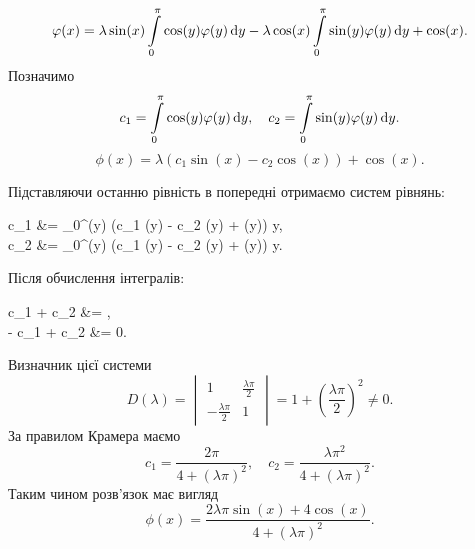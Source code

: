 \begin{solution}
	\[ \varphi(x) = \lambda \sin(x) \displaystyle\int\limits_0^\pi \cos(y) \varphi(y) \mathop{}\!\mathrm{d} y - \lambda \cos(x) \displaystyle\int\limits_0^\pi \sin(y) \varphi(y) \mathop{}\!\mathrm{d} y + \cos(x). \]
	Позначимо \[ c_1 = \displaystyle\int\limits_0^\pi \cos(y) \varphi(y) \mathop{}\!\mathrm{d} y, \quad c_2 = \displaystyle\int\limits_0^\pi \sin(y) \varphi(y) \mathop{}\!\mathrm{d} y. \]
	\[ \phi(x) = \lambda (c_1 \sin(x) - c_2 \cos(x)) + \cos(x). \]

	Підставляючи останню рівність в попередні отримаємо систем рівнянь:
	\begin{system*}
		c_1 &= \Int_0^\pi \cos(y) (\lambda c_1 \sin(y) - \lambda c_2 \cos(y) + \cos(y)) \diff y, \\
		c_2 &= \Int_0^\pi \sin(y) (\lambda c_1 \sin(y) - \lambda c_2 \cos(y) + \cos(y)) \diff y.
	\end{system*}
	Після обчислення інтегралів:
	\begin{system*}
		c_1 +  c_2 &= \frac{\pi}{2}, \\
		-  c_1 + c_2 &= 0.
	\end{system*}
	Визначник цієї системи
	\[ D(\lambda) = \begin{vmatrix} 1 & \frac{\lambda\pi}{2} \\ -\frac{\lambda\pi}{2} & 1 \end{vmatrix} = 1 + \left( \frac{\lambda \pi}{2} \right)^2 \ne 0. \]
	За правилом Крамера маємо
	\[ c_1 = \dfrac{2 \pi}{4 + (\lambda \pi)^2}, \quad c_2 = \dfrac{\lambda \pi^2}{4 + (\lambda \pi)^2}. \]
	Таким чином розв'язок має вигляд
	\[ \phi(x) = \dfrac{2 \lambda \pi \sin(x) + 4 \cos (x)}{4 + (\lambda \pi)^2}. \]
\end{solution}

